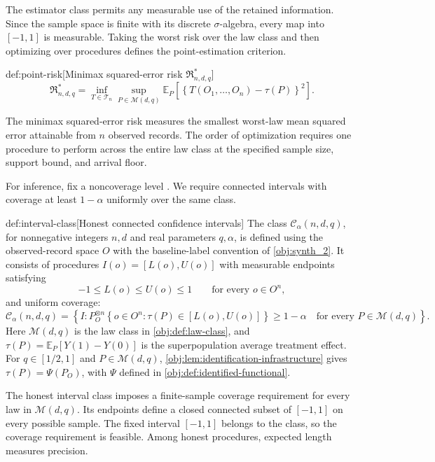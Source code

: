 The estimator class  permits any measurable use of the retained information. Since the sample space is finite with its discrete \(\sigma\)-algebra, every map into \([-1,1]\) is measurable. Taking the worst risk over the law class and then optimizing over procedures defines the point-estimation criterion.

\begin{definitionv}{def:point-risk}[Minimax squared-error risk \(\mathfrak R^*_{n,d,q}\)]
\[
\mathfrak R^*_{n,d,q}
=
\inf_{T\in\mathcal T_n}
\sup_{P\in\mathcal M(d,q)}
\mathbb E_P
\left[
\left\{
T(O_1,\ldots,O_n)-\tau(P)
\right\}^2
\right].
\]
\end{definitionv}

The minimax squared-error risk  measures the smallest worst-law mean squared error attainable from \(n\) observed records. The order of optimization requires one procedure to perform across the entire law class at the specified sample size, support bound, and arrival floor.

For inference, fix a noncoverage level . We require connected intervals with coverage at least \(1-\alpha\) uniformly over the same class.

\begin{definitionv}{def:interval-class}[Honest connected confidence intervals]
The class \(\mathcal C_\alpha(n,d,q)\), for nonnegative integers \(n,d\) and real parameters \(q,\alpha\), is defined using the observed-record space \(O\) with the baseline-label convention of \cref{obj:synth_2}. It consists of procedures \(I(o)=[L(o),U(o)]\) with measurable endpoints satisfying
\[
-1\le L(o)\le U(o)\le1
\qquad\text{for every }o\in O^n,
\]
and uniform coverage:
\[
\mathcal C_\alpha(n,d,q)
=
\left\{
I:
P_O^{\otimes n}\!\left\{
o\in O^n:\tau(P)\in[L(o),U(o)]
\right\}\ge1-\alpha
\quad\text{for every }P\in\mathcal M(d,q)
\right\}.
\]
Here \(\mathcal M(d,q)\) is the law class in \cref{obj:def:law-class}, and \(\tau(P)=\mathbb E_P[Y(1)-Y(0)]\) is the superpopulation average treatment effect. For \(q\in[1/2,1]\) and \(P\in\mathcal M(d,q)\), \cref{obj:lem:identification-infrastructure} gives \(\tau(P)=\Psi(P_O)\), with \(\Psi\) defined in \cref{obj:def:identified-functional}.
\end{definitionv}

The honest interval class  imposes a finite-sample coverage requirement for every law in \(\mathcal M(d,q)\). Its endpoints define a closed connected subset of \([-1,1]\) on every possible sample. The fixed interval \([-1,1]\) belongs to the class, so the coverage requirement is feasible. Among honest procedures, expected length measures precision.

